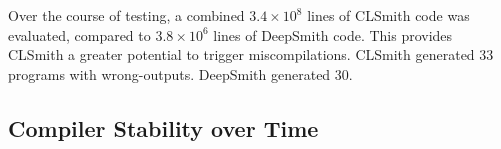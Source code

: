 
Over the course of testing, a combined $3.4 \times 10^8$ lines of CLSmith code was evaluated, compared to $3.8 \times 10^6$ lines of DeepSmith code. This provides CLSmith a greater potential to trigger miscompilations. CLSmith generated 33 programs with wrong-outputs. DeepSmith generated 30. 


%
%


\subsection{Compiler Stability over Time}%
\label{subsec:clangs}

